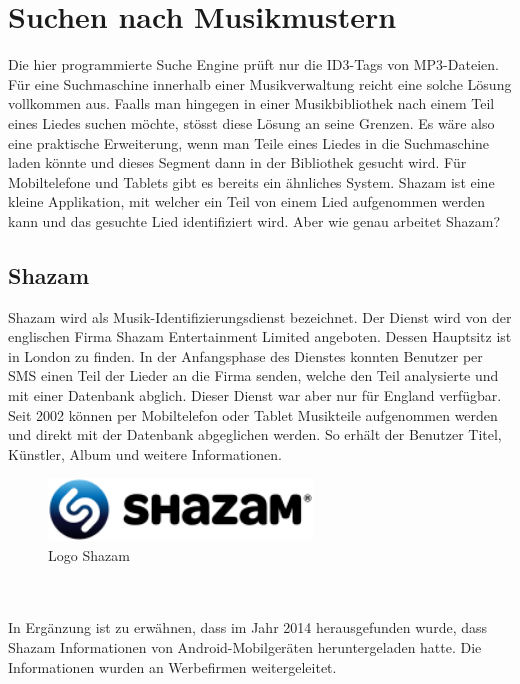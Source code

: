 \documentclass[12pt,a4paper,ngerman]{report}
\begin{document}
\section{Suchen nach Musikmustern}
Die hier programmierte Suche Engine prüft nur die ID3-Tags von MP3-Dateien. Für eine Suchmaschine innerhalb einer Musikverwaltung reicht eine solche Lösung vollkommen aus. Faalls man hingegen in einer Musikbibliothek nach einem Teil eines Liedes suchen möchte, stösst diese Lösung an seine Grenzen. Es wäre also eine praktische Erweiterung, wenn man Teile eines Liedes in die Suchmaschine laden könnte und dieses Segment dann in der Bibliothek gesucht wird. Für Mobiltelefone und Tablets gibt es bereits ein ähnliches System. Shazam ist eine kleine Applikation, mit welcher ein Teil von einem Lied aufgenommen werden kann und das gesuchte Lied identifiziert wird. Aber wie genau arbeitet Shazam?
\subsection{Shazam}
Shazam wird als Musik-Identifizierungsdienst bezeichnet. Der Dienst wird von der englischen Firma Shazam Entertainment Limited angeboten. Dessen Hauptsitz ist in London zu finden. In der Anfangsphase des Dienstes konnten Benutzer per SMS einen Teil der Lieder an die Firma senden, welche den Teil analysierte und mit einer Datenbank abglich. Dieser Dienst war aber nur für England verfügbar. Seit 2002 können per Mobiltelefon oder Tablet Musikteile aufgenommen werden und direkt mit der Datenbank abgeglichen werden. So erhält der Benutzer Titel, Künstler, Album und weitere Informationen.
\begin{figure}[h!]
\centering
\includegraphics[width=7cm]{img/shazam_logo.png}
\caption{Logo Shazam\protect\footnotemark}
\end{figure}
\\
\\
In Ergänzung ist zu erwähnen, dass im Jahr 2014 herausgefunden wurde, dass Shazam Informationen von Android-Mobilgeräten heruntergeladen hatte. Die Informationen wurden an Werbefirmen weitergeleitet.
\end{document}
